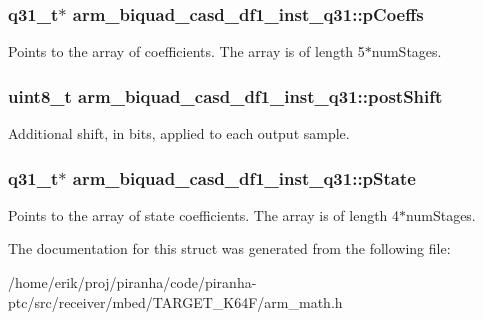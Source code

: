 \subsubsection[{\texorpdfstring{p\+Coeffs}{pCoeffs}}]{\setlength{\rightskip}{0pt plus 5cm}q31\+\_\+t$\ast$ arm\+\_\+biquad\+\_\+casd\+\_\+df1\+\_\+inst\+\_\+q31\+::p\+Coeffs}\hypertarget{structarm__biquad__casd__df1__inst__q31_aa62366c632f3b5305086f841f079dbd2}{}\label{structarm__biquad__casd__df1__inst__q31_aa62366c632f3b5305086f841f079dbd2}
Points to the array of coefficients. The array is of length 5$\ast$num\+Stages. 
\subsubsection[{\texorpdfstring{post\+Shift}{postShift}}]{\setlength{\rightskip}{0pt plus 5cm}uint8\+\_\+t arm\+\_\+biquad\+\_\+casd\+\_\+df1\+\_\+inst\+\_\+q31\+::post\+Shift}\hypertarget{structarm__biquad__casd__df1__inst__q31_a636c7fbe09ec4bef0bc0a4b4e2151cbe}{}\label{structarm__biquad__casd__df1__inst__q31_a636c7fbe09ec4bef0bc0a4b4e2151cbe}
Additional shift, in bits, applied to each output sample. 
\subsubsection[{\texorpdfstring{p\+State}{pState}}]{\setlength{\rightskip}{0pt plus 5cm}q31\+\_\+t$\ast$ arm\+\_\+biquad\+\_\+casd\+\_\+df1\+\_\+inst\+\_\+q31\+::p\+State}\hypertarget{structarm__biquad__casd__df1__inst__q31_a5dcf4727f58eb4e8e8b392508d8657bb}{}\label{structarm__biquad__casd__df1__inst__q31_a5dcf4727f58eb4e8e8b392508d8657bb}
Points to the array of state coefficients. The array is of length 4$\ast$num\+Stages. 

The documentation for this struct was generated from the following file\+:\begin{DoxyCompactItemize}
\item 
/home/erik/proj/piranha/code/piranha-\/ptc/src/receiver/mbed/\+T\+A\+R\+G\+E\+T\+\_\+\+K64\+F/arm\+\_\+math.\+h\end{DoxyCompactItemize}
